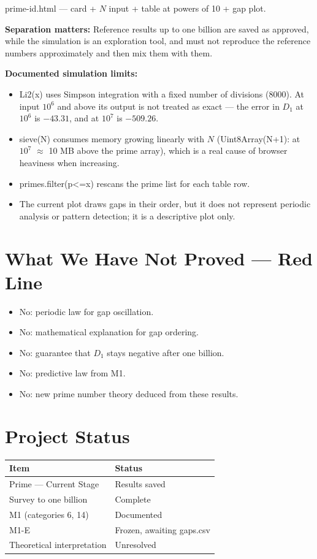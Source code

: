 \documentclass[12pt,a4paper]{article}
\begin{document}
prime-id.html — card + $N$ input + table at powers of 10 + gap plot.

\textbf{Separation matters:} Reference results up to one billion are saved as approved, while the simulation is an exploration tool, and must not reproduce the reference numbers approximately and then mix them with them.

\textbf{Documented simulation limits:}
\begin{itemize}
\item Li2(x) uses Simpson integration with a fixed number of divisions (8000). At input $10^6$ and above its output is not treated as exact — the error in $D_1$ at $10^6$ is $-43.31$, and at $10^7$ is $-509.26$.
\item sieve(N) consumes memory growing linearly with $N$ (Uint8Array(N+1): at $10^7$ $\approx$ 10 MB above the prime array), which is a real cause of browser heaviness when increasing.
\item primes.filter(p<=x) rescans the prime list for each table row.
\item The current plot draws gaps in their order, but it does not represent periodic analysis or pattern detection; it is a descriptive plot only.
\end{itemize}

\section{What We Have Not Proved — Red Line}

\begin{itemize}
\item No: periodic law for gap oscillation.
\item No: mathematical explanation for gap ordering.
\item No: guarantee that $D_1$ stays negative after one billion.
\item No: predictive law from M1.
\item No: new prime number theory deduced from these results.
\end{itemize}

\section{Project Status}

\begin{table}[h]
\centering
\begin{tabular}{ll}
\toprule
Item & Status \\
\midrule
Prime — Current Stage & Results saved \\
Survey to one billion & Complete \\
M1 (categories 6, 14) & Documented \\
M1-E & Frozen, awaiting gaps.csv \\
Theoretical interpretation & Unresolved \\
\bottomrule
\end{tabular}
\end{table}
\end{document}
